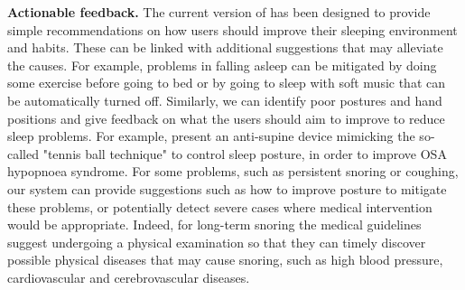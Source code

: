 \textbf{Actionable feedback.} The current version of {\systemname} has been designed to provide simple recommendations on how users should improve their sleeping environment and habits. These can be linked with additional suggestions that may alleviate the causes. For example, problems in falling asleep can be mitigated by doing some exercise before going to bed or by going to sleep with soft music that can be automatically turned off. Similarly, we can identify poor postures and hand positions and give feedback on what the users should aim to improve to reduce sleep problems. For example, \cite{posture} present an anti-supine device mimicking the so-called "tennis ball technique" to control sleep posture, in order to improve OSA hypopnoea syndrome. For some problems, such as persistent snoring or coughing, our system can provide suggestions such as how to improve posture to mitigate these problems, or potentially detect severe cases where medical intervention would be appropriate. Indeed, for long-term snoring the medical guidelines suggest undergoing a physical examination so that they can timely discover possible physical diseases that may cause snoring, such as high blood pressure, cardiovascular and cerebrovascular diseases.
